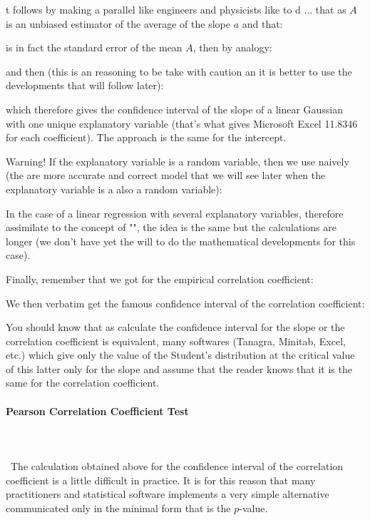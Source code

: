 	t follows by making a parallel like engineers and physicists like to d ... that as $A$ is an unbiased estimator of the average of the slope $a$ and that:
	
	is in fact the standard error of the mean $A$, then by analogy:
	
	and then (this is an reasoning to be take with caution an it is better to use the developments that will follow later):
	
	which therefore gives the confidence interval of the slope of a linear Gaussian with one unique explanatory variable (that's what gives Microsoft Excel 11.8346 for each coefficient). The approach is the same for the intercept.
	
	Warning! If the explanatory variable is a random variable, then we use naively (the are more accurate and correct model that we will see later when the explanatory variable is a also a random variable):
	
	
	In the case of a linear regression with several explanatory variables, therefore assimilate to the concept of "", the idea is the same but the calculations are longer (we don't have yet the will to do the mathematical developments for this case).
	
	Finally, remember that we got for the empirical correlation coefficient:
	
	We then verbatim get the famous confidence interval of the correlation coefficient:
	
	You should know that as calculate the confidence interval for the slope or the correlation coefficient is equivalent, many softwares (Tanagra, Minitab, Excel, etc.) which give only the value of the Student's distribution at the critical value of this latter only for the slope and assume that the reader knows that it is the same for the correlation coefficient.
	
	\paragraph{Pearson Correlation Coefficient Test}\mbox{}\\\\\
	The calculation obtained above for the confidence interval of the correlation coefficient is a little difficult in practice. It is for this reason that many practitioners and statistical software implements a very simple alternative communicated only in the minimal form that is the $p$-value.
	
